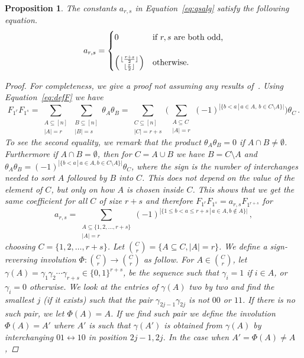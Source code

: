 \documentclass[11pt]{amsart}
\newtheorem{prop}[theorem]{Proposition}
\theoremstyle{definition}
\numberwithin{equation}{section}
\begin{document}
\begin{prop}\label{prop:comm}
The constants $a_{r,s}$ in Equation~\eqref{eq:qsalg} satisfy the following equation.
$$ a_{r,s}=
\begin{cases}
	0  &\text{if $r,s$ are both odd,}\\
	\\
	\left({\lfloor \frac{r+s}{2} \rfloor \atop \lfloor \frac{r}{2} \rfloor}\right)&\text{otherwise.}
\end{cases}
$$

\begin{proof}
For completeness, we give a proof not assuming any results of~\cite{FLP}. Using Equation~\eqref{eq:defF} we have
$$F_{1^r}F_{1^s}= \sum_{\substack{A \subseteq [n]\\|A|=r}}  \sum_{\substack{B \subseteq [n]\\|B|=s}} \theta_A \theta_B
= \sum_{\substack{C \subseteq [n]\\|C|=r+s}} \Big(\sum_{\substack{A\subseteq C \\|A|=r}} (-1)^{|\{b<a\,|\,a\in A,\, b\in C\setminus A\}|} \Big) \theta_C\,.
$$
To see the second equality, we remark that the product $\theta_A\theta_B=0$ if $A\cap B\ne \emptyset$. Furthermore if $A\cap B= \emptyset$, then for $C=A\cup B$
we have $B=C\setminus A$ and  $\theta_A\theta_B=(-1)^{|\{b<a\,|\,a\in A, b\in C\setminus A\}|} \theta_C$, where the sign is the number of interchanges needed to sort $A$ followed by $B$ into $C$.
This does not depend on the value of the element of $C$, but only on how $A$ is chosen inside $C$. This shows that we get the same coefficient for all $C$ of size $r+s$ and therefore $F_{1^r} F_{1^s} = a_{r,s} F_{1^{r+s}}$ for
\begin{equation}\label{eq:signa}
 a_{r,s}=\sum_{\substack{A\subseteq \{1,2,\ldots, r+s\}\\ |A|=r}}  (-1)^{|\{1\le b<a\le r+s\,|\,a\in A, b\not\in A\}|} \,,
 \end{equation}
 choosing $C=\{1,2,\ldots,r+s\}$. Let ${C\choose r}=\{A\subseteq C, |A|=r\}$. We define a sign-reversing involution $\Phi\colon {C\choose r}\to{C\choose r}$ as follow.
For $A\in  {C\choose r}$, let $\gamma(A)=\gamma_1\gamma_2\cdots\gamma_{r+s}\in\{0,1\}^{r+s}$, be the sequence such that
 $\gamma_i=1$ if $i\in A$, or $\gamma_i=0$ otherwise.
 We look at the  entries of  $\gamma(A)$ two by two and find the smallest $j$ (if it exists) such that the  pair
 $\gamma_{2j-1}\gamma_{2j}$ is not $00$ or $11$. If there is no such pair, we let $\Phi(A)=A$. If we find such pair we define the involution $\Phi(A)=A'$ where $A'$ is such that $\gamma(A')$ is obtained from $\gamma(A)$ by interchanging $01\leftrightarrow 10$ in position $2j-1,2j$. In the case when  $A'=\Phi(A)\ne A$,

\end{proof}
\end{prop}
\end{document}
